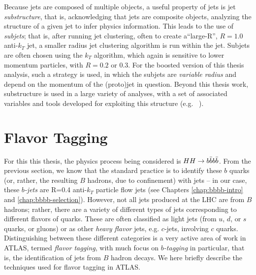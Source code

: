 Because jets are composed of multiple objects, a useful property of jets is jet \emph{substructure}, that is, 
acknowledging that jets are composite objects, analyzing the structure of a given jet to infer physics information. 
This leads to the use of \emph{subjets}; that is, after running jet clustering, often to create a``large-R'', $R=1.0$ 
anti-$k_{T}$ jet, a smaller radius jet clustering algorithm is run within the jet. Subjets are often chosen using the 
$k_{T}$ algorithm, which again is sensitive to lower momentum particles, with $R=0.2$ or 0.3. For the boosted version 
of this thesis analysis, such a strategy is used, in which the subjets are \emph{variable radius} and depend on the 
momentum of the (proto)jet in question. Beyond this thesis work, substructure is used in a large variety of analyses, 
with a set of associated variables and tools developed for exploiting this structure (e.g. ~\cite{ECFs}).
 
\section{Flavor Tagging}
For this this thesis, the physics process being considered is $HH\rightarrow b\bar{b}b\bar{b}$. From the previous section, we 
know that the standard practice is to identify these $b$ quarks (or, rather, the resulting $B$ hadrons, due to confinement) 
with jets -- in our case, these \emph{$b$-jets} are R=0.4 anti-$k_{T}$ particle flow jets (see Chapters \ref{chap:bbbb-intro} and \ref{chap:bbbb-selection}). 
However, not all jets produced at the LHC are from $B$ hadrons; rather, there are a variety of different types of jets 
corresponding to different flavors of quarks. These are often classified as light jets (from $u$, $d$, or $s$ quarks, or 
gluons) or as other \emph{heavy flavor} jets, e.g. $c$-jets, involving $c$ quarks. Distinguishing between these different 
categories is a very active area of work in ATLAS, termed \emph{flavor tagging}, with much focus on \emph{$b$-tagging} in 
particular, that is, the identification of jets from $B$ hadron decays. We here briefly describe the techniques used 
for flavor tagging in ATLAS.


